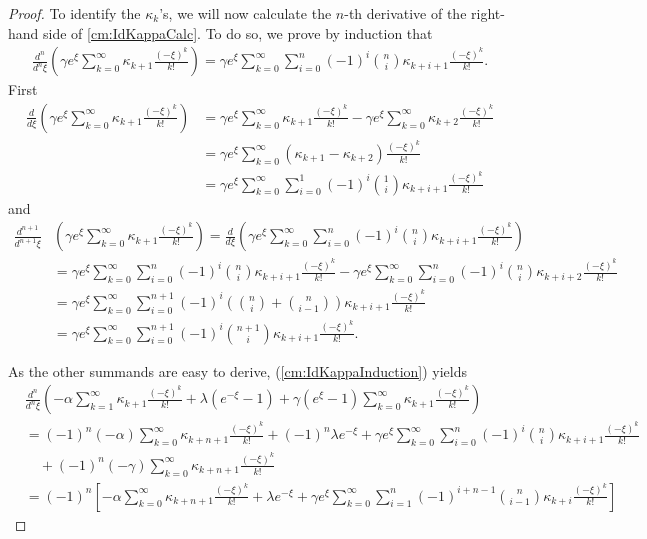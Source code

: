\begin{proof}
\noindent
To identify the $\kappa_k$'s, we will now calculate the $n$-th derivative of the
right-hand side of \eqref{cm:IdKappaCalc}. To do so, we prove by induction that
\begin{align} \label{cm:IdKappaInduction}
\frac{d^n}{d^n \xi} \left( \gamma e^\xi \sum_{k=0}^\infty \kappa_{k+1}
\frac{(-\xi)^k}{k!} \right)
= \gamma e^\xi \sum_{k=0}^\infty \sum_{i=0}^n (-1)^i \binom{n}{i} \kappa_{k+i+1}
\frac{(-\xi)^k}{k!} .
\end{align}
First
\begin{align*}
\frac{d}{d \xi} \left( \gamma e^\xi \sum_{k=0}^\infty \kappa_{k+1}
\frac{(-\xi)^k}{k!} \right)
& = \gamma e^\xi \sum_{k=0}^\infty \kappa_{k+1}
\frac{(-\xi)^k}{k!} - \gamma e^\xi \sum_{k=0}^\infty \kappa_{k+2}
\frac{(-\xi)^k}{k!} \\
& = \gamma e^\xi \sum_{k=0}^\infty ( \kappa_{k+1} - \kappa_{k+2} )
\frac{(-\xi)^k}{k!} \\
& = \gamma e^\xi \sum_{k=0}^\infty \sum_{i=0}^1 (-1)^i \binom{1}{i} \kappa_{k+i+1}
\frac{(-\xi)^k}{k!}
\end{align*}
and
\begin{align*}
\frac{d^{n+1}}{d^{n+1} \xi} & \left( \gamma e^\xi \sum_{k=0}^\infty \kappa_{k+1}
\frac{(-\xi)^k}{k!} \right)
= \frac{d}{d \xi}
\left(
\gamma e^\xi \sum_{k=0}^\infty \sum_{i=0}^n (-1)^i
\binom{n}{i} \kappa_{k+i+1} \frac{(-\xi)^k}{k!}
\right) \\
& = \gamma e^\xi \sum_{k=0}^\infty \sum_{i=0}^n (-1)^i
\binom{n}{i} \kappa_{k+i+1} \frac{(-\xi)^k}{k!}
-
\gamma e^\xi \sum_{k=0}^\infty \sum_{i=0}^n (-1)^i
\binom{n}{i} \kappa_{k+i+2} \frac{(-\xi)^k}{k!} \\
& = \gamma e^\xi \sum_{k=0}^\infty \sum_{i=0}^{n+1} (-1)^i
\left( \binom{n}{i} + \binom{n}{i-1} \right ) \kappa_{k+i+1} \frac{(-\xi)^k}{k!}
\\
& = \gamma e^\xi \sum_{k=0}^\infty \sum_{i=0}^{n+1} (-1)^i \binom{n+1}{i}
\kappa_{k+i+1} \frac{(-\xi)^k}{k!} .
\end{align*}

\noindent
As the other summands are easy to derive, (\ref{cm:IdKappaInduction}) yields
\begin{align*}
&\frac{d^n}{d^n \xi}
\left(
-\alpha \sum_{k=1}^\infty \kappa_{k+1} \frac{ (-\xi)^k }{ k! }
+ \lambda (e^{- \xi} - 1)
+ \gamma (e^{\xi} - 1) \sum_{k=0}^\infty \kappa_{k+1} \frac{ (-\xi)^k }{ k! }
\right) \\ \nonumber
&= (-1)^n (-\alpha) \sum_{k=0}^\infty \kappa_{k+n+1} \frac{(-\xi)^k}{k!}
+ (-1)^n \lambda e^{- \xi}
+ \gamma e^\xi \sum_{k=0}^\infty \sum_{i=0}^n (-1)^i \binom{n}{i} \kappa_{k+i+1}
\frac{(-\xi)^k}{k!} \\ \nonumber
&\quad + (-1)^n (-\gamma) \sum_{k=0}^\infty \kappa_{k+n+1} \frac{(-\xi)^k}{k!}
\\ &= (-1)^n
\left[
-\alpha \sum_{k=0}^\infty \kappa_{k+n+1} \frac{(-\xi)^k}{k!}
+ \lambda e^{- \xi}
+ \gamma e^\xi \sum_{k=0}^\infty \sum_{i=1}^n (-1)^{i+n-1} \binom{n}{i-1}
\kappa_{k+i} \frac{(-\xi)^k}{k!}
\right]
\end{align*}


\end{proof}
